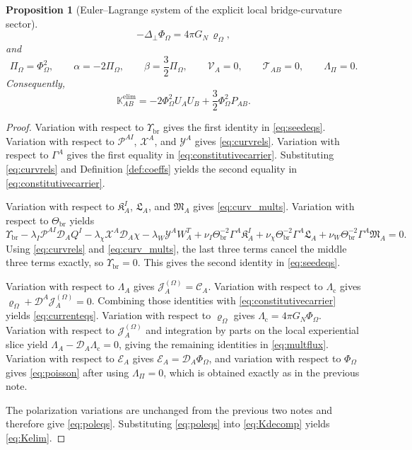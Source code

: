 \documentclass[11pt]{article}
\newcommand{\ProjSub}{P}
\newcommand{\SpatialD}{\mathcal D}
\newcommand{\LapPerp}{\Delta_\perp}
\newcommand{\FlowPot}{\Phi_\Omega}
\newcommand{\BalanceField}{\Pi_\Omega}
\newcommand{\BalMult}{\Lambda_\Pi}
\newcommand{\SourceDensity}{\varrho_\Omega}
\newcommand{\SourceCurrent}{\mathcal J^{(\Omega)}}
\newcommand{\ConstCurrent}{\mathcal C}
\newcommand{\ContMult}{\Lambda_{\mathrm c}}
\newcommand{\CurrentMult}{\Lambda}
\newcommand{\ConstGamma}{\Gamma}
\newcommand{\CurvQMult}{\mathscr P}
\newcommand{\CurvChiMult}{\mathscr X}
\newcommand{\CurvTransMult}{\mathscr Y}
\newcommand{\SourceFlux}{\mathcal E}
\newcommand{\AuxPol}{\mathbb K}
\newcommand{\CurvSeed}{\Theta_{\mathrm{br}}}
\newcommand{\CurvSeedMult}{\Upsilon_{\mathrm{br}}}
\newcommand{\CurvOneI}{\mathfrak K}
\newcommand{\CurvOneChi}{\mathfrak L}
\newcommand{\CurvOneW}{\mathfrak M}
\newtheorem{proposition}{Proposition}
\begin{document}
\begin{proposition}[Euler--Lagrange system of the explicit local bridge-curvature sector]
\begin{equation}
\label{eq:curv_mults}
\end{equation}
\begin{equation}
-\LapPerp\FlowPot=4\pi G_N\,\SourceDensity,
\label{eq:poisson}
\end{equation}
and
\begin{equation}
\BalanceField=\FlowPot^2,
\qquad
\alpha=-2\BalanceField,
\qquad
\beta=\frac32\BalanceField,
\qquad
\mathcal V_A=0,
\qquad
\mathcal T_{AB}=0,
\qquad
\BalMult=0.
\label{eq:poleqs}
\end{equation}
Consequently,
\begin{equation}
\AuxPol_{AB}^{\mathrm{elim}}
=
-2\FlowPot^2U_AU_B
+\frac32\FlowPot^2\ProjSub_{AB}.
\label{eq:Kelim}
\end{equation}
\end{proposition}

\begin{proof}
Variation with respect to \(\CurvSeedMult\) gives the first identity in \eqref{eq:seedeqs}. Variation with respect to \(\CurvQMult^{AI}\), \(\CurvChiMult^A\), and \(\CurvTransMult^A\) gives \eqref{eq:curvrels}. Variation with respect to \(\ConstGamma^A\) gives the first equality in \eqref{eq:constitutivecarrier}. Substituting \eqref{eq:curvrels} and Definition \ref{def:coeffs} yields the second equality in \eqref{eq:constitutivecarrier}.

Variation with respect to \(\CurvOneI_A^I\), \(\CurvOneChi_A\), and \(\CurvOneW_A\) gives \eqref{eq:curv_mults}. Variation with respect to \(\CurvSeed\) yields
\[
\CurvSeedMult
-\lambda_I\CurvQMult^{AI}\SpatialD_AQ^I
-\lambda_\chi\CurvChiMult^A\SpatialD_A\chi
-\lambda_W\CurvTransMult^AW_A^T
+\nu_I\CurvSeed^{-2}\ConstGamma^A\CurvOneI_A^I
+\nu_\chi\CurvSeed^{-2}\ConstGamma^A\CurvOneChi_A
+\nu_W\CurvSeed^{-2}\ConstGamma^A\CurvOneW_A
=0.
\]
Using \eqref{eq:curvrels} and \eqref{eq:curv_mults}, the last three terms cancel the middle three terms exactly, so \(\CurvSeedMult=0\). This gives the second identity in \eqref{eq:seedeqs}.

Variation with respect to \(\CurrentMult_A\) gives \(\SourceCurrent_A=\ConstCurrent_A\). Variation with respect to \(\ContMult\) gives \(\SourceDensity+\SpatialD^A\SourceCurrent_A=0\). Combining those identities with \eqref{eq:constitutivecarrier} yields \eqref{eq:currenteqs}. Variation with respect to \(\SourceDensity\) gives \(\ContMult=4\pi G_N\FlowPot\). Variation with respect to \(\SourceCurrent_A\) and integration by parts on the local experiential slice yield \(\CurrentMult_A-\SpatialD_A\ContMult=0\), giving the remaining identities in \eqref{eq:multflux}. Variation with respect to \(\SourceFlux_A\) gives \(\SourceFlux_A=\SpatialD_A\FlowPot\), and variation with respect to \(\FlowPot\) gives \eqref{eq:poisson} after using \(\BalMult=0\), which is obtained exactly as in the previous note.

The polarization variations are unchanged from the previous two notes and therefore give \eqref{eq:poleqs}. Substituting \eqref{eq:poleqs} into \eqref{eq:Kdecomp} yields \eqref{eq:Kelim}.
\end{proof}
\end{document}
